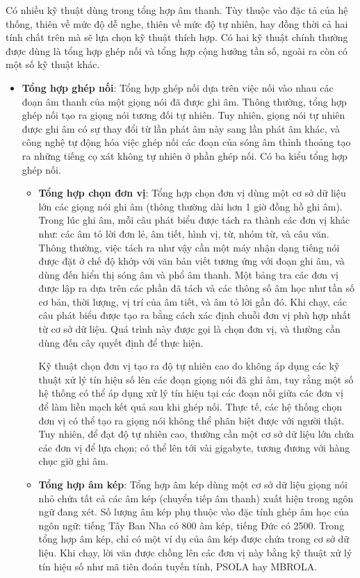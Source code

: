 \indent Có nhiều kỹ thuật dùng trong tổng hợp âm thanh. Tùy thuộc vào đặc tả của hệ thống, thiên về mức độ dễ nghe, thiên về mức độ tự nhiên, hay đồng thời cả hai tính chất trên mà sẽ lựa chọn kỹ thuật thích hợp. Có hai kỹ thuật chính thường được dùng là tổng hợp ghép nối và tổng hợp cộng hưởng tần số, ngoài ra còn có một số kỹ thuật khác.
\begin{itemize}
\item \textbf{Tổng hợp ghép nối}: Tổng hợp ghép nối dựa trên việc nối vào nhau các đoạn âm thanh của một giọng nói đã được ghi âm. Thông thường, tổng hợp ghép nối tạo ra giọng nói tương đối tự nhiên. Tuy nhiên, giọng nói tự nhiên được ghi âm có sự thay đổi từ lần phát âm này sang lần phát âm khác, và công nghệ tự động hóa việc ghép nối các đoạn của sóng âm thỉnh thoảng tạo ra những tiếng cọ xát không tự nhiên ở phần ghép nối. Có ba kiểu tổng hợp ghép nối.
\begin{itemize}
\item \textbf{Tổng hợp chọn đơn vị}: Tổng hợp chọn đơn vị dùng một cơ sở dữ liệu lớn các giọng nói ghi âm (thông thường dài hơn 1 giờ đồng hồ ghi âm). Trong lúc ghi âm, mỗi câu phát biểu được tách ra thành các đơn vị khác như: các âm tỏ lời đơn lẻ, âm tiết, hình vị, từ, nhóm từ, và câu văn. Thông thường, việc tách ra như vậy cần một máy nhận dạng tiếng nói được đặt ở chế độ khớp với văn bản viết tương ứng với đoạn ghi âm, và dùng đến hiển thị sóng âm và phổ âm thanh. Một bảng tra các đơn vị được lập ra dựa trên các phần đã tách và các thông số âm học như tần số cơ bản, thời lượng, vị trí của âm tiết, và âm tỏ lời gần đó. Khi chạy, các câu phát biểu được tạo ra bằng cách xác định chuỗi đơn vị phù hợp nhất từ cơ sở dữ liệu. Quá trình này được gọi là chọn đơn vị, và thường cần dùng đến cây quyết định để thực hiện.

Kỹ thuật chọn đơn vị tạo ra độ tự nhiên cao do không áp dụng các kỹ thuật xử lý tín hiệu số lên các đoạn giọng nói đã ghi âm, tuy rằng một số hệ thống có thể áp dụng xử lý tín hiệu tại các đoạn nối giữa các đơn vị để làm liền mạch kết quả sau khi ghép nối. Thực tế, các hệ thống chọn đơn vị có thể tạo ra giọng nói không thể phân biệt được với người thật. Tuy nhiên, để đạt độ tự nhiên cao, thường cần một cơ sở dữ liệu lớn chứa các đơn vị để lựa chọn; có thể lên tới vài gigabyte, tương đương với hàng chục giờ ghi âm.

\item \textbf{Tổng hợp âm kép}: Tổng hợp âm kép dùng một cơ sở dữ liệu giọng nói nhỏ chứa tất cả các âm kép (chuyển tiếp âm thanh) xuất hiện trong ngôn ngữ đang xét. Số lượng âm kép phụ thuộc vào đặc tính ghép âm học của ngôn ngữ: tiếng Tây Ban Nha có 800 âm kép, tiếng Đức có 2500. Trong tổng hợp âm kép, chỉ có một ví dụ của âm kép được chứa trong cơ sở dữ liệu. Khi chạy, lời văn được chồng lên các đơn vị này bằng kỹ thuật xử lý tín hiệu số như mã tiên đoán tuyến tính, PSOLA hay MBROLA.


\end{itemize}
\end{itemize}
